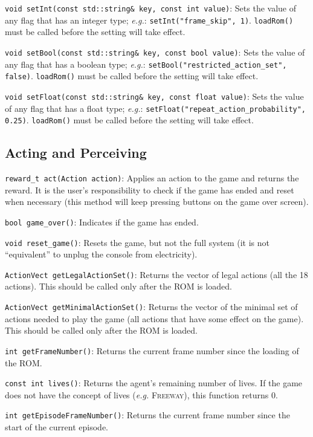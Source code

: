 \documentclass[12pt]{article}
\begin{document}
  \verb+void setInt(const std::string& key, const int value)+: Sets the value of any flag
  that has an integer type; \emph{e.g.}: \verb+setInt("frame_skip", 1)+. \verb+loadRom()+
  must be called before the setting will take effect.
  
  \verb+void setBool(const std::string& key, const bool value)+: Sets the value of any flag
  that has a boolean type; \emph{e.g.}: \verb+setBool("restricted_action_set", false)+.
  \verb+loadRom()+ must be called before the setting will take effect.
  
  \verb+void setFloat(const std::string& key, const float value)+: Sets the value of any flag
  that has a float type; \emph{e.g.}: \verb+setFloat("repeat_action_probability", 0.25)+.
  \verb+loadRom()+ must be called before the setting will take effect.
  
  \subsection{Acting and Perceiving}
  
  \indent \indent \verb+reward_t act(Action action)+: Applies an action to the game and returns the
  reward. It is the user's responsibility to check if the game has ended and reset when necessary
  (this method will keep pressing buttons on the game over screen).
  
  \verb+bool game_over()+: Indicates if the game has ended.
  
  \verb+void reset_game()+: Resets the game, but not the full system (it is not ``equivalent''
  to  unplug the console from electricity).
  
  \verb+ActionVect getLegalActionSet()+: Returns the vector of legal actions (all the 18 actions).
  This should be called only after the ROM is loaded.
  
  \verb+ActionVect getMinimalActionSet()+: Returns the vector of the minimal set of actions
  needed to play the game (all actions that have some effect on the game). This should be
  called only after the ROM is loaded.
  
  \verb+int getFrameNumber()+: Returns the current frame number since the loading of the ROM.
  
  \verb+const int lives()+: Returns the agent's remaining number of lives. If the game does not have 
  the concept of lives (\emph{e.g.} \textsc{Freeway}), this function returns 0.
  
  \verb+int getEpisodeFrameNumber()+: Returns the current frame number since the start of the
  current episode.
  
\end{document}
